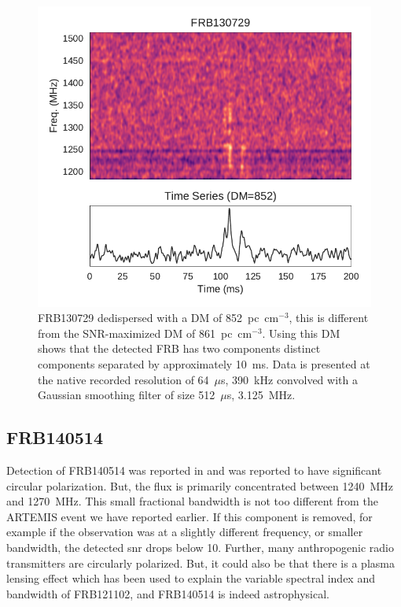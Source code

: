 \documentclass[a4paper,fleqn,usenatbib]{mnras}
\begin{document}
\begin{figure}
    \includegraphics[width=1.0\linewidth]{figures/FRB130729.pdf}
    \caption{FRB130729 dedispersed with a DM of 852~pc~cm$^{-3}$, this is
    different from the SNR-maximized DM of 861~pc~cm$^{-3}$. Using this DM shows
    that the detected FRB has two components distinct components separated by
    approximately 10~ms. Data is presented at the native recorded resolution of
    64~$\mu$s, 390~kHz convolved with a Gaussian smoothing filter of size
    512~$\mu$s, 3.125~MHz.
    }
    \label{fig:FRB130729}
\end{figure}

\subsection{FRB140514}

Detection of FRB140514 was reported in \citep{2015MNRAS.447..246P} and was
reported to have significant circular polarization. But, the flux is primarily
concentrated between 1240~MHz and 1270~MHz. This small fractional bandwidth is
not too different from the ARTEMIS event we have reported earlier.  If this
component is removed, for example if the observation was at a slightly different
frequency, or smaller bandwidth, the detected \gls{snr} drops below 10.
Further, many anthropogenic radio transmitters are circularly polarized. But,
it could also be that there is a plasma lensing effect
\citep{2017ApJ...842...35C} which has been used to explain the variable spectral
index and bandwidth of FRB121102, and FRB140514 is indeed astrophysical.
\end{document}
